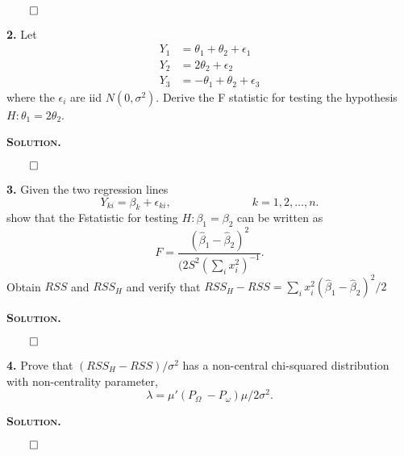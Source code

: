 \documentclass{article}
\begin{document}
\begin{flushright}
\(\qed\)\end{flushright}







\newpage
\textbf{2.} Let
\begin{align*}
Y_1 &= \theta_1 + \theta_2 + \epsilon_1 \\
Y_2 &= 2\theta_2 + \epsilon_2 \\
Y_3 &= -\theta_1 + \theta_2 + \epsilon_3
\end{align*}
where the \(\epsilon_i\) are iid \(N(0,\sigma^2) \). Derive the F statistic for testing the hypothesis \(H:\theta_1=2\theta_2\). 

\vspace{5mm}
\textbf{\textsc{Solution.}} 

\begin{flushright}
\(\qed\)\end{flushright}

\newpage
\textbf{3.} Given the two regression lines
\[
Y_{ki} = \beta_k+\epsilon_{ki}, \hspace{3cm} k=1,2,\ldots, n.
\]
show that the Fstatistic for testing \(H: \beta_1=\beta_2\) can be written as 
\[
F = \frac{ (\hat \beta_1 - \hat \beta_2 )^2 }{(2S^2(\sum_i x_i^2)^{-1}}. 
\]
Obtain \(RSS\) and \(RSS_H\) and verify that \(RSS_H - RSS= \sum_i x_i^2(\hat \beta_1 - \hat \beta_2)^2 /2\) 

\vspace{5mm}
\textbf{\textsc{Solution.}} 

\begin{flushright}
\(\qed\)\end{flushright}

\newpage
\textbf{4.} Prove that \((RSS_H-RSS)/\sigma^2 \) has a non-central chi-squared distribution with non-centrality parameter,
 \[\lambda = \mu'(P_\Omega~-P_\omega)\mu/2\sigma^2. \]


\vspace{5mm}
\textbf{\textsc{Solution.}} 

\begin{flushright}
\(\qed\)\end{flushright}
\end{document}
